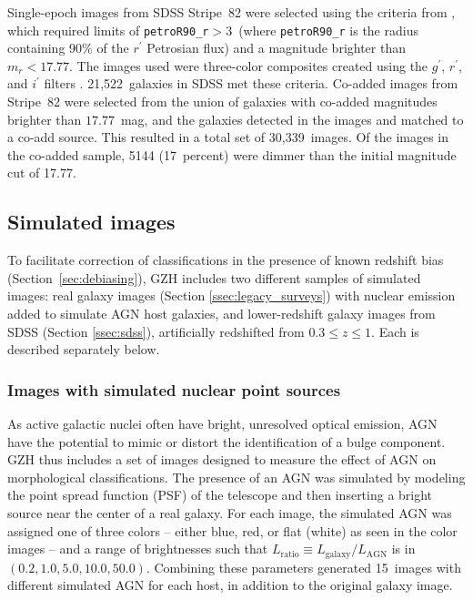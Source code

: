 \documentclass[twocolumn]{aastex6}
\begin{document}
Single-epoch images from SDSS Stripe~82 were selected using the criteria
from \citet{wil13}, which required limits of \texttt{petroR90\_r}$ >
3$\arcsec~(where \texttt{petroR90\_r} is the radius containing 90\% of the
$r^\prime$ Petrosian flux) and a magnitude brighter than $m_r < 17.77$. The
images used were three-color composites created using the $g^\prime$, $r^\prime$, and
$i^\prime$ filters \citep{nie04}. 21,522~galaxies in SDSS met these criteria.
Co-added images from Stripe~82 were selected from the union of galaxies with
co-added magnitudes brighter than $17.77$~mag, and the galaxies detected in the
\stripe{} images and matched to a co-add source. This resulted in a total
set of 30,339~images. Of the images in the co-added sample, 5144 (17~percent)
were dimmer than the initial magnitude cut of 17.77. 


\subsection{Simulated \hst{} images}\label{ssec:simulatedimages}

To facilitate correction of classifications in the presence of known redshift
bias (Section~\ref{sec:debiasing}), GZH includes two different samples of
simulated \hst{} images: real \hst{} galaxy images (Section
\ref{ssec:legacy_surveys}) with nuclear emission added to simulate AGN host
galaxies, and lower-redshift galaxy images from SDSS (Section \ref{ssec:sdss}),
artificially redshifted from $0.3 \leq z \leq 1$.  Each is described separately
below. 

\subsubsection{Images with simulated nuclear point sources}\label{ssec:sim_agn}

As active galactic nuclei often have bright, unresolved optical emission, AGN
have the potential to mimic or distort the identification of a bulge component.
GZH thus includes a set of images designed to measure the effect of AGN on
morphological classifications.  The presence of an AGN was simulated by
modeling the point spread function (PSF) of the telescope and then inserting a
bright source near the center of a real galaxy. For each image, the simulated
AGN was assigned one of three colors -- either blue, red, or flat (white) as
seen in the color images -- and a range of brightnesses such that
$L_\mathrm{ratio} \equiv L_\mathrm{galaxy}/L_\mathrm{AGN}$ is in
$(0.2,1.0,5.0,10.0,50.0)$. Combining these parameters generated 15~images
with different simulated AGN for each host, in addition to the original galaxy
image. 
\end{document}
